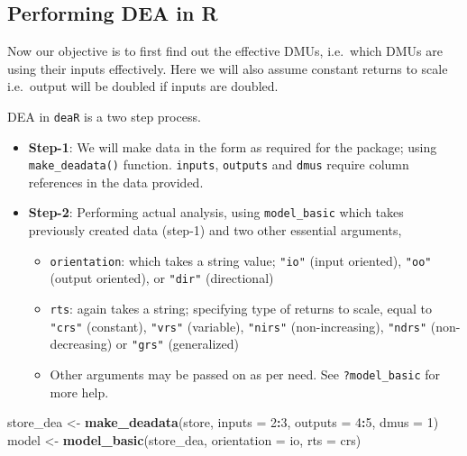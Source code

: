 \documentclass[
]{book}
\newenvironment{Shaded}{\begin{snugshade}}{\end{snugshade}}
\newcommand{\AttributeTok}[1]{\textcolor[rgb]{0.13,0.29,0.53}{#1}}
\newcommand{\DecValTok}[1]{\textcolor[rgb]{0.00,0.00,0.81}{#1}}
\newcommand{\FunctionTok}[1]{\textcolor[rgb]{0.13,0.29,0.53}{\textbf{#1}}}
\newcommand{\NormalTok}[1]{#1}
\newcommand{\OtherTok}[1]{\textcolor[rgb]{0.56,0.35,0.01}{#1}}
\newcommand{\SpecialCharTok}[1]{\textcolor[rgb]{0.81,0.36,0.00}{\textbf{#1}}}
\newcommand{\StringTok}[1]{\textcolor[rgb]{0.31,0.60,0.02}{#1}}
\providecommand{\tightlist}{%
  \setlength{\itemsep}{0pt}\setlength{\parskip}{0pt}}
\begin{document}
\hypertarget{performing-dea-in-r}{%
\subsection{Performing DEA in R}\label{performing-dea-in-r}}

Now our objective is to first find out the effective DMUs, i.e.~which DMUs are using their inputs effectively. Here we will also assume constant returns to scale i.e.~output will be doubled if inputs are doubled.

DEA in \texttt{deaR} is a two step process.

\begin{itemize}
\tightlist
\item
  \textbf{Step-1}: We will make data in the form as required for the package; using \texttt{make\_deadata()} function. \texttt{inputs}, \texttt{outputs} and \texttt{dmus} require column references in the data provided.
\item
  \textbf{Step-2}: Performing actual analysis, using \texttt{model\_basic} which takes previously created data (step-1) and two other essential arguments,

  \begin{itemize}
  \tightlist
  \item
    \texttt{orientation}: which takes a string value; \texttt{"io"} (input oriented), \texttt{"oo"} (output oriented), or \texttt{"dir"} (directional)
  \item
    \texttt{rts}: again takes a string; specifying type of returns to scale, equal to \texttt{"crs"} (constant), \texttt{"vrs"} (variable), \texttt{"nirs"} (non-increasing), \texttt{"ndrs"} (non-decreasing) or \texttt{"grs"} (generalized)
  \item
    Other arguments may be passed on as per need. See \texttt{?model\_basic} for more help.
  \end{itemize}
\end{itemize}

\begin{Shaded}
\begin{Highlighting}[]
\NormalTok{store\_dea }\OtherTok{\textless{}{-}} \FunctionTok{make\_deadata}\NormalTok{(store, }\AttributeTok{inputs =} \DecValTok{2}\SpecialCharTok{:}\DecValTok{3}\NormalTok{, }\AttributeTok{outputs =} \DecValTok{4}\SpecialCharTok{:}\DecValTok{5}\NormalTok{, }\AttributeTok{dmus =} \DecValTok{1}\NormalTok{)}
\NormalTok{model }\OtherTok{\textless{}{-}} \FunctionTok{model\_basic}\NormalTok{(store\_dea, }\AttributeTok{orientation =} \StringTok{\textquotesingle{}io\textquotesingle{}}\NormalTok{, }\AttributeTok{rts =} \StringTok{\textquotesingle{}crs\textquotesingle{}}\NormalTok{)}
\end{Highlighting}
\end{Shaded}
\end{document}
